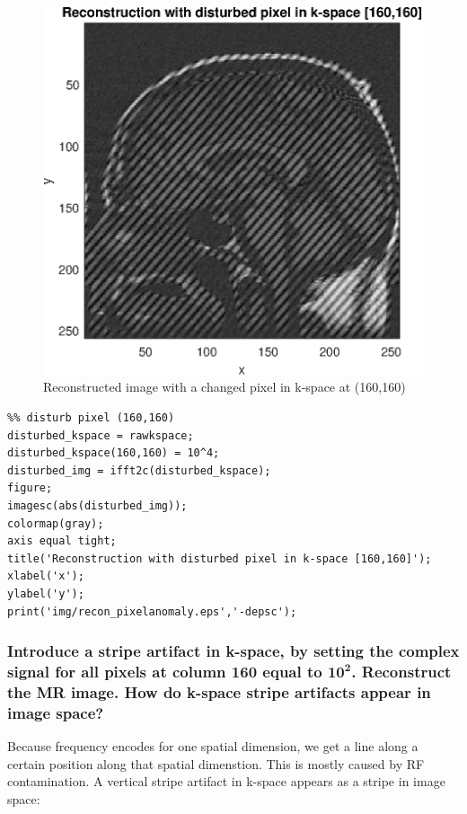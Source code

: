 \begin{figure}[h!]
    \centering
    \includegraphics[width=.8\linewidth] {./homework4/img/recon_pixelanomaly.eps}
    \caption{Reconstructed image with a changed pixel in k-space at (160,160)}
    \label{fig:recon_phase}
\end{figure}



\begin{lstlisting}
%% disturb pixel (160,160)
disturbed_kspace = rawkspace;
disturbed_kspace(160,160) = 10^4;
disturbed_img = ifft2c(disturbed_kspace);
figure;
imagesc(abs(disturbed_img));
colormap(gray);
axis equal tight;
title('Reconstruction with disturbed pixel in k-space [160,160]');
xlabel('x');
ylabel('y');
print('img/recon_pixelanomaly.eps','-depsc');
\end{lstlisting}




\subsubsection{Introduce a stripe artifact in k-space, by setting the complex signal for all pixels at
column 160 equal to $\mathbf{10^2}$. Reconstruct the MR image. How do k-space stripe artifacts appear
in image space?}
Because frequency encodes for one spatial dimension, we get a line along a certain position along that spatial dimenstion. This is mostly caused by RF contamination.
A vertical stripe artifact in k-space appears as a stripe in image space:

